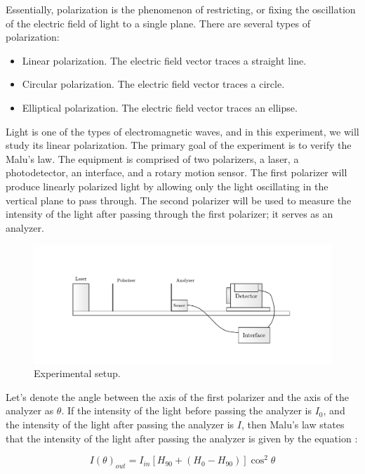 \documentclass[10pt]{article}
\begin{document}
Essentially, polarization is the phenomenon of restricting, or fixing the oscillation of the electric field of light to a single plane. There are several types of polarization:
\begin{itemize}
  \item Linear polarization. The electric field vector traces a straight line.
  \item Circular polarization. The electric field vector traces a circle.
  \item Elliptical polarization. The electric field vector traces an ellipse.
\end{itemize}

Light is one of the types of electromagnetic waves, and in this experiment, we will study its linear polarization. The primary goal of the experiment is to verify the Malu's law. The equipment is comprised of two polarizers, a laser, a photodetector, an interface, and a rotary motion sensor. The first polarizer will produce linearly polarized light by allowing only the light oscillating in the vertical plane to pass through. The second polarizer will be used to measure the intensity of the light after passing through the first polarizer; it serves as an analyzer.

\begin{figure}[ht]
  \centering
  \includegraphics[scale=0.6]{figures/f1.pdf}
  \caption{Experimental setup.}
  \label{fig:1}
\end{figure}

Let's denote the angle between the axis of the first polarizer and the axis of the analyzer as $\theta$. If the intensity of the light before passing the analyzer is $I_0$, and the intensity of the light after passing the analyzer is $I$, then Malu's law states that the intensity of the light after passing the analyzer is given by the equation \cite{Hecht_2017}:

\begin{equation}
  I(\theta)_{out} = I_{in}\left[H_{90}+\left(H_0-H_{90}\right)\right]\cos^2\theta
  \label{eq:1}
\end{equation}
\end{document}

